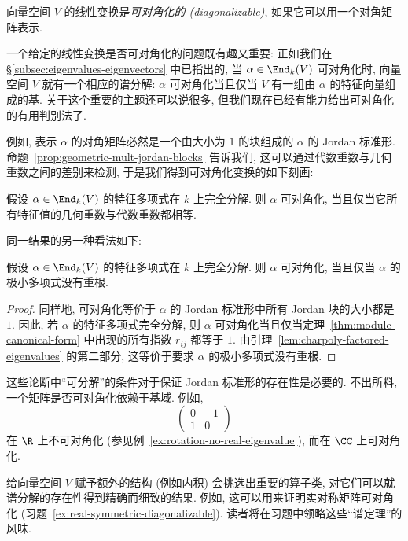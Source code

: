 向量空间 $V$ 的线性变换是\emph{可对角化的 (diagonalizable)}, 如果它可以用一个对角矩阵表示.

一个给定的线性变换是否可对角化的问题既有趣又重要: 正如我们在 §\ref{subsec:eigenvalues-eigenvectors} 中已指出的, 当 $\alpha\in\End_k(V)$ 可对角化时, 向量空间 $V$ 就有一个相应的谱分解: $\alpha$ 可对角化当且仅当 $V$ 有一组由 $\alpha$ 的特征向量组成的基. 关于这个重要的主题还可以说很多, 但我们现在已经有能力给出可对角化的有用判别法了.

例如, 表示 $\alpha$ 的对角矩阵必然是一个由大小为 $1$ 的块组成的 $\alpha$ 的 Jordan 标准形. 命题~\ref{prop:geometric-mult-jordan-blocks} 告诉我们, 这可以通过代数重数与几何重数之间的差别来检测, 于是我们得到可对角化变换的如下刻画:

\begin{corollary}\label{cor:diagonalizable-criterion}
假设 $\alpha\in\End_k(V)$ 的特征多项式在 $k$ 上完全分解. 则 $\alpha$ 可对角化, 当且仅当它所有特征值的几何重数与代数重数都相等.
\end{corollary}

同一结果的另一种看法如下:

\begin{proposition}\label{prop:diagonalizable-minpoly}
假设 $\alpha\in\End_k(V)$ 的特征多项式在 $k$ 上完全分解. 则 $\alpha$ 可对角化, 当且仅当 $\alpha$ 的极小多项式没有重根.
\end{proposition}

\begin{proof}
同样地, 可对角化等价于 $\alpha$ 的 Jordan 标准形中所有 Jordan 块的大小都是 $1$. 因此, 若 $\alpha$ 的特征多项式完全分解, 则 $\alpha$ 可对角化当且仅当定理~\ref{thm:module-canonical-form} 中出现的所有指数 $r_{ij}$ 都等于 $1$. 由引理~\ref{lem:charpoly-factored-eigenvalues} 的第二部分, 这等价于要求 $\alpha$ 的极小多项式没有重根.
\end{proof}

这些论断中``可分解''的条件对于保证 Jordan 标准形的存在性是必要的. 不出所料, 一个矩阵是否可对角化依赖于基域. 例如,
\[
\begin{pmatrix}0&-1\\1&0\end{pmatrix}
\]
在 $\R$ 上不可对角化 (参见例~\ref{ex:rotation-no-real-eigenvalue}), 而在 $\CC$ 上可对角化.

给向量空间 $V$ 赋予额外的结构 (例如内积) 会挑选出重要的算子类, 对它们可以就谱分解的存在性得到精确而细致的结果. 例如, 这可以用来证明实对称矩阵可对角化 (习题~\ref{ex:real-symmetric-diagonalizable}). 读者将在习题中领略这些``谱定理''的风味.

